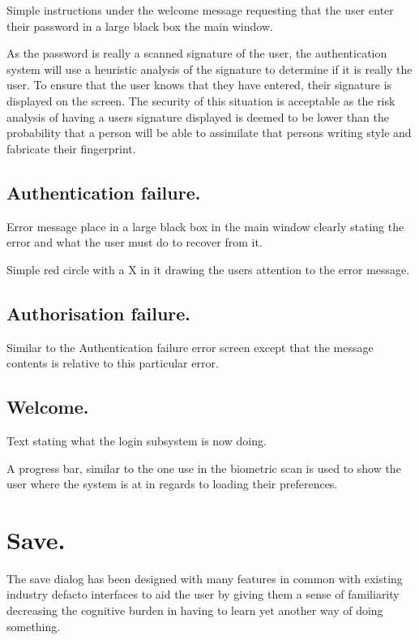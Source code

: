 Simple instructions under the welcome message requesting that the user enter their password in a large black box the main window.

As the password is really a scanned signature of the user, the authentication system will use a heuristic analysis of the signature to determine if it is really the user. To ensure that the user knows that they have entered, their signature is displayed on the screen. The security of this situation is acceptable as the risk analysis of having a users signature displayed is deemed to be lower than the probability that a person will be able to assimilate that persons writing style and fabricate their fingerprint.

\subsection{Authentication failure.}

Error message place in a large black box in the main window clearly stating the error and what the user must do to recover from it.

Simple red circle with a X in it drawing the users attention to the error message.

\subsection{Authorisation failure.}

Similar to the Authentication failure error screen except that the message contents is relative to this particular error.

\subsection{Welcome.}

Text stating what the login subsystem is now doing.

A progress bar, similar to the one use in the biometric scan is used to show the user where the system is at in regards to loading their preferences.

\section{Save.}

The save dialog has been designed with many features in common with existing industry defacto interfaces to aid the user by giving them a sense of familiarity decreasing the cognitive burden in having to learn yet another way of doing something.

